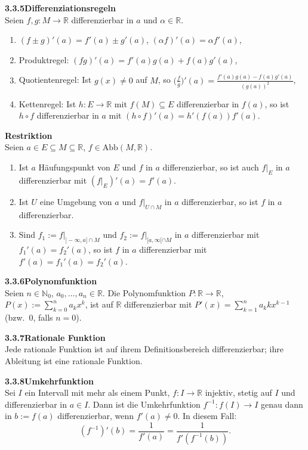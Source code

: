 \documentclass[a4paper,12pt]{article}
\newcommand{\gentry}[3]{%
  \noindent\textbf{#1\quad #2}\nopagebreak\\[0.2em]
  #3\par\smallskip
}
\begin{document}
\gentry{3.3.5}{Differenziationsregeln}{%
  Seien $f, g : M \to \mathbb{R}$ differenzierbar in $a$ und $\alpha \in \mathbb{R}$.
  \begin{enumerate}[label=(\roman*),topsep=2pt,itemsep=1pt]
    \item $(f \pm g)'(a) = f'(a) \pm g'(a)$, $(\alpha f)'(a) = \alpha f'(a)$,
    \item Produktregel: $(f g)'(a) = f'(a) g(a) + f(a) g'(a)$,
    \item Quotientenregel: Ist $g(x) \neq 0$ auf $M$, so
          $\bigl(\tfrac{f}{g}\bigr)'(a) = \tfrac{f'(a) g(a) - f(a) g'(a)}{(g(a))^2}$,
    \item Kettenregel: Ist $h : E \to \mathbb{R}$ mit $f(M) \subseteq E$ differenzierbar
          in $f(a)$, so ist $h \circ f$ differenzierbar in $a$ mit
          $(h \circ f)'(a) = h'(f(a)) f'(a)$.
  \end{enumerate}
}

\gentry{}{Restriktion}{%
  Seien $a \in E \subseteq M \subseteq \mathbb{R}$, $f \in \mathrm{Abb}(M, \mathbb{R})$.
  \begin{enumerate}[label=(\roman*),topsep=2pt,itemsep=1pt]
    \item Ist $a$ H\"aufungspunkt von $E$ und $f$ in $a$ differenzierbar, so ist auch
          $f|_E$ in $a$ differenzierbar mit $(f|_E)'(a) = f'(a)$.
    \item Ist $U$ eine Umgebung von $a$ und $f|_{U \cap M}$ in $a$ differenzierbar,
          so ist $f$ in $a$ differenzierbar.
    \item Sind $f_1 := f|_{]-\infty, a] \cap M}$ und $f_2 := f|_{[a, \infty[ \cap M}$
          in $a$ differenzierbar mit $f_1'(a) = f_2'(a)$, so ist $f$ in $a$
          differenzierbar mit $f'(a) = f_1'(a) = f_2'(a)$.
  \end{enumerate}
}

\gentry{3.3.6}{Polynomfunktion}{%
  Seien $n \in \mathbb{N}_0$, $a_0, \ldots, a_n \in \mathbb{R}$. Die Polynomfunktion
  $P : \mathbb{R} \to \mathbb{R}$, $P(x) := \sum_{k=0}^n a_k x^k$, ist auf $\mathbb{R}$
  differenzierbar mit
  $P'(x) = \sum_{k=1}^n a_k k x^{k-1}$ (bzw.\ $0$, falls $n = 0$).
}

\gentry{3.3.7}{Rationale Funktion}{%
  Jede rationale Funktion ist auf ihrem Definitionsbereich differenzierbar; ihre
  Ableitung ist eine rationale Funktion.
}

\gentry{3.3.8}{Umkehrfunktion}{%
  Sei $I$ ein Intervall mit mehr als einem Punkt, $f : I \to \mathbb{R}$ injektiv,
  stetig auf $I$ und differenzierbar in $a \in I$. Dann ist die Umkehrfunktion
  $f^{-1} : f(I) \to I$ genau dann in $b := f(a)$ differenzierbar, wenn $f'(a) \neq 0$.
  In diesem Fall:
  \[
    (f^{-1})'(b) = \frac{1}{f'(a)} = \frac{1}{f'(f^{-1}(b))}.
  \]
}
\end{document}
